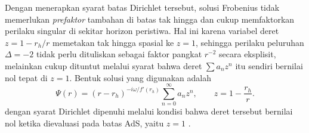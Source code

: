 Dengan menerapkan syarat batas Dirichlet tersebut, solusi Frobenius tidak memerlukan
\textit{prefaktor} tambahan di batas tak hingga dan cukup memfaktorkan perilaku singular di
sekitar horizon peristiwa. Hal ini karena variabel deret $z=1-r_h/r$ memetakan tak hingga
spasial ke $z=1$, sehingga perilaku peluruhan $\Delta=-2$ tidak perlu dituliskan sebagai
faktor pangkat $r^{-2}$ secara eksplisit, melainkan cukup dituntut melalui syarat bahwa
deret $\sum a_n z^n$ itu sendiri bernilai nol tepat di $z=1$. Bentuk solusi yang digunakan
adalah
\begin{equation}
    \Psi(r)=(r-r_h)^{-i\omega/f'(r_h)}\sum_{n=0}^{\infty} a_n z^n, \qquad z=1-\frac{r_h}{r}.
    \label{eq:ansatz_sads}
\end{equation}
dengan syarat Dirichlet dipenuhi melalui kondisi bahwa deret tersebut bernilai nol ketika
dievaluasi pada batas AdS, yaitu $z=1$ \parencite{Horowitz2000}.